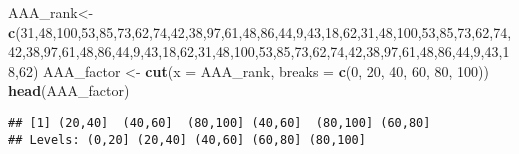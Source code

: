 \documentclass[]{article}
\newenvironment{Shaded}{\begin{snugshade}}{\end{snugshade}}
\newcommand{\KeywordTok}[1]{\textcolor[rgb]{0.13,0.29,0.53}{\textbf{#1}}}
\newcommand{\DataTypeTok}[1]{\textcolor[rgb]{0.13,0.29,0.53}{#1}}
\newcommand{\DecValTok}[1]{\textcolor[rgb]{0.00,0.00,0.81}{#1}}
\newcommand{\StringTok}[1]{\textcolor[rgb]{0.31,0.60,0.02}{#1}}
\newcommand{\NormalTok}[1]{#1}
\begin{document}
\begin{Shaded}
\begin{Highlighting}[]
\NormalTok{AAA_rank<-}\KeywordTok{c}\NormalTok{(}\DecValTok{31}\NormalTok{,}\DecValTok{48}\NormalTok{,}\DecValTok{100}\NormalTok{,}\DecValTok{53}\NormalTok{,}\DecValTok{85}\NormalTok{,}\DecValTok{73}\NormalTok{,}\DecValTok{62}\NormalTok{,}\DecValTok{74}\NormalTok{,}\DecValTok{42}\NormalTok{,}\DecValTok{38}\NormalTok{,}\DecValTok{97}\NormalTok{,}\DecValTok{61}\NormalTok{,}\DecValTok{48}\NormalTok{,}\DecValTok{86}\NormalTok{,}\DecValTok{44}\NormalTok{,}\DecValTok{9}\NormalTok{,}\DecValTok{43}\NormalTok{,}\DecValTok{18}\NormalTok{,}\DecValTok{62}\NormalTok{,}\DecValTok{31}\NormalTok{,}\DecValTok{48}\NormalTok{,}\DecValTok{100}\NormalTok{,}\DecValTok{53}\NormalTok{,}\DecValTok{85}\NormalTok{,}\DecValTok{73}\NormalTok{,}\DecValTok{62}\NormalTok{,}\DecValTok{74}\NormalTok{,}\DecValTok{42}\NormalTok{,}\DecValTok{38}\NormalTok{,}\DecValTok{97}\NormalTok{,}\DecValTok{61}\NormalTok{,}\DecValTok{48}\NormalTok{,}\DecValTok{86}\NormalTok{,}\DecValTok{44}\NormalTok{,}\DecValTok{9}\NormalTok{,}\DecValTok{43}\NormalTok{,}\DecValTok{18}\NormalTok{,}\DecValTok{62}\NormalTok{,}\DecValTok{31}\NormalTok{,}\DecValTok{48}\NormalTok{,}\DecValTok{100}\NormalTok{,}\DecValTok{53}\NormalTok{,}\DecValTok{85}\NormalTok{,}\DecValTok{73}\NormalTok{,}\DecValTok{62}\NormalTok{,}\DecValTok{74}\NormalTok{,}\DecValTok{42}\NormalTok{,}\DecValTok{38}\NormalTok{,}\DecValTok{97}\NormalTok{,}\DecValTok{61}\NormalTok{,}\DecValTok{48}\NormalTok{,}\DecValTok{86}\NormalTok{,}\DecValTok{44}\NormalTok{,}\DecValTok{9}\NormalTok{,}\DecValTok{43}\NormalTok{,}\DecValTok{18}\NormalTok{,}\DecValTok{62}\NormalTok{)}
\NormalTok{AAA_factor <-}\StringTok{ }\KeywordTok{cut}\NormalTok{(}\DataTypeTok{x =}\NormalTok{ AAA_rank, }\DataTypeTok{breaks =} \KeywordTok{c}\NormalTok{(}\DecValTok{0}\NormalTok{, }\DecValTok{20}\NormalTok{, }\DecValTok{40}\NormalTok{, }\DecValTok{60}\NormalTok{, }\DecValTok{80}\NormalTok{, }\DecValTok{100}\NormalTok{))}
\KeywordTok{head}\NormalTok{(AAA_factor)}
\end{Highlighting}
\end{Shaded}

\begin{verbatim}
## [1] (20,40]  (40,60]  (80,100] (40,60]  (80,100] (60,80] 
## Levels: (0,20] (20,40] (40,60] (60,80] (80,100]
\end{verbatim}
\end{document}
